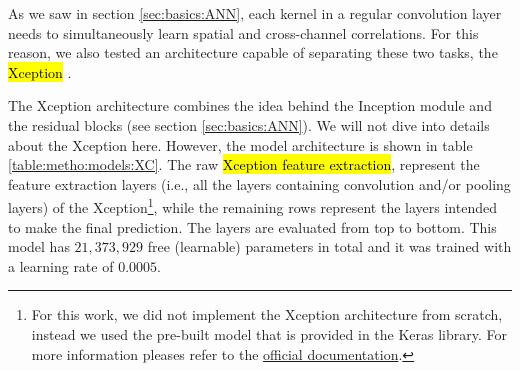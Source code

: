 

\graphicspath{{./Sections/Methodology/Resources/}}


As we saw in section \ref{sec:basics:ANN}, each kernel in a regular convolution layer needs to simultaneously learn spatial and cross-channel correlations. For this reason, we also tested an architecture capable of separating these two tasks, the \hl{Xception} \cite{chollet2017xception}.

The Xception architecture combines the idea behind the Inception module and the residual blocks (see section \ref{sec:basics:ANN}).
We will not dive into details about the Xception here. However, the model architecture is shown in table \ref{table:metho:models:XC}.
The raw \hl{Xception feature extraction}, represent the feature extraction layers (i.e., all the layers containing convolution and/or pooling layers) of the Xception\footnote{For this work, we did not implement the Xception architecture from scratch, instead we used the pre-built model that is provided in the Keras library. For more information pleases refer to the \href{https://www.tensorflow.org/api_docs/python/tf/keras/applications/xception}{official documentation}.}, while the remaining rows represent the layers intended to make the final prediction. The layers are evaluated from top to bottom. This model has $21,373,929$ free (learnable) parameters in total and it was trained with a learning rate of $0.0005$.

\setlength{\mylinewidth}{\linewidth-7pt}%
\setlength{\mylengtha}{0.35\mylinewidth-2\arraycolsep}%
\setlength{\mylengthb}{0.25\mylinewidth-2\arraycolsep}%
\setlength{\mylengthc}{0.18\mylinewidth-2\arraycolsep}%

